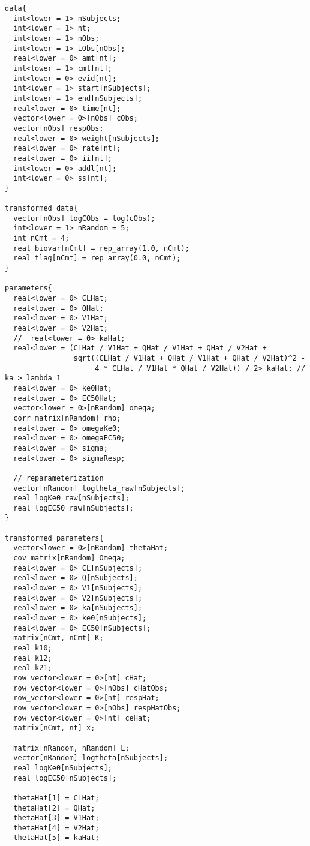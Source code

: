 \documentclass[12pt, reqno, oneside]{amsbook}
\numberwithin{equation}{chapter}
\numberwithin{figure}{chapter}
\numberwithin{table}{chapter}
\theoremstyle{remark}
\begin{document}
\begin{verbatim}
data{
  int<lower = 1> nSubjects;
  int<lower = 1> nt;
  int<lower = 1> nObs;
  int<lower = 1> iObs[nObs];
  real<lower = 0> amt[nt];
  int<lower = 1> cmt[nt];
  int<lower = 0> evid[nt];
  int<lower = 1> start[nSubjects];
  int<lower = 1> end[nSubjects];
  real<lower = 0> time[nt];
  vector<lower = 0>[nObs] cObs;
  vector[nObs] respObs;
  real<lower = 0> weight[nSubjects];
  real<lower = 0> rate[nt];
  real<lower = 0> ii[nt];
  int<lower = 0> addl[nt];
  int<lower = 0> ss[nt];
}

transformed data{
  vector[nObs] logCObs = log(cObs);
  int<lower = 1> nRandom = 5;
  int nCmt = 4;
  real biovar[nCmt] = rep_array(1.0, nCmt);
  real tlag[nCmt] = rep_array(0.0, nCmt);
}

parameters{
  real<lower = 0> CLHat;
  real<lower = 0> QHat;
  real<lower = 0> V1Hat;
  real<lower = 0> V2Hat;
  //  real<lower = 0> kaHat;
  real<lower = (CLHat / V1Hat + QHat / V1Hat + QHat / V2Hat +
                sqrt((CLHat / V1Hat + QHat / V1Hat + QHat / V2Hat)^2 -
                     4 * CLHat / V1Hat * QHat / V2Hat)) / 2> kaHat; // ka > lambda_1
  real<lower = 0> ke0Hat;
  real<lower = 0> EC50Hat;
  vector<lower = 0>[nRandom] omega;
  corr_matrix[nRandom] rho;
  real<lower = 0> omegaKe0;
  real<lower = 0> omegaEC50;
  real<lower = 0> sigma;
  real<lower = 0> sigmaResp;

  // reparameterization
  vector[nRandom] logtheta_raw[nSubjects];
  real logKe0_raw[nSubjects];
  real logEC50_raw[nSubjects];
}

transformed parameters{
  vector<lower = 0>[nRandom] thetaHat;
  cov_matrix[nRandom] Omega;
  real<lower = 0> CL[nSubjects];
  real<lower = 0> Q[nSubjects];
  real<lower = 0> V1[nSubjects];
  real<lower = 0> V2[nSubjects];
  real<lower = 0> ka[nSubjects];
  real<lower = 0> ke0[nSubjects];
  real<lower = 0> EC50[nSubjects];
  matrix[nCmt, nCmt] K;
  real k10;
  real k12;
  real k21;
  row_vector<lower = 0>[nt] cHat;
  row_vector<lower = 0>[nObs] cHatObs;
  row_vector<lower = 0>[nt] respHat;
  row_vector<lower = 0>[nObs] respHatObs;
  row_vector<lower = 0>[nt] ceHat;
  matrix[nCmt, nt] x;

  matrix[nRandom, nRandom] L;
  vector[nRandom] logtheta[nSubjects];
  real logKe0[nSubjects];
  real logEC50[nSubjects];

  thetaHat[1] = CLHat;
  thetaHat[2] = QHat;
  thetaHat[3] = V1Hat;
  thetaHat[4] = V2Hat;
  thetaHat[5] = kaHat;


\end{verbatim}
\end{document}
